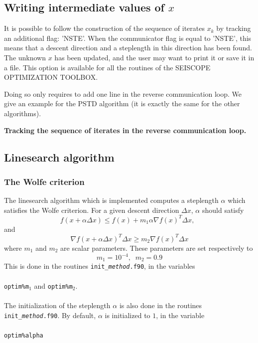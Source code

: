\documentclass[a4paper,twoside,final,onecolumn,11pt,openright]{article}
\begin{document}
\subsection{Writing intermediate values of $x$}

It is possible to follow the construction of the sequence of iterates $x_k$ by tracking an additional flag: 'NSTE'. When the communicator flag is equal to 'NSTE', this means that a descent direction and a steplength in this direction has been found. The unknown $x$ has been updated, and the user may want to print it or save it in a file. This option is available for all the routines of the SEISCOPE OPTIMIZATION TOOLBOX. 

Doing so only requires to add one line in the reverse communication loop. We give an example for the PSTD algorithm (it is exactly the same for the other algorithms). 

\framebox{
\small
 
}
\normalsize
\begin{center}
\textbf{Tracking the sequence of iterates in the reverse communication loop.} 
\end{center}

\subsection{Linesearch algorithm}

\subsubsection{The Wolfe criterion}

The linesearch algorithm which is implemented computes a steplength $\alpha$ which satisfies the Wolfe criterion. For a given descent direction $\Delta x$, $\alpha$ should satisfy
\begin{equation}
 f(x+\alpha \Delta x)\leq f(x)+m_1\alpha \nabla f(x)^{T}\Delta x, \;\;
\end{equation}
and
\begin{equation}
 \nabla f(x+\alpha \Delta x)^{T}\Delta x \geq m_2 \nabla f(x)^{T}\Delta x
\end{equation}
where $m_1$ and $m_2$ are scalar parameters. These parameters are set respectively to 
\begin{equation}
 m_1=10^{-4}, \;\; m_2=0.9
\end{equation}
This is done in the routines \texttt{init\_\textit{method}.f90}, in the variables 
\\
\\
\texttt{optim\%m$_1$} and \texttt{optim\%m$_2$}. 
\\
\\
The initialization of the steplength $\alpha$ is also done in the routines \texttt{init\_\textit{method}.f90}. By default, $\alpha$ is initialized to $1$, in the variable 
\\
\\
\texttt{optim\%alpha}
\\
\\
\end{document}
